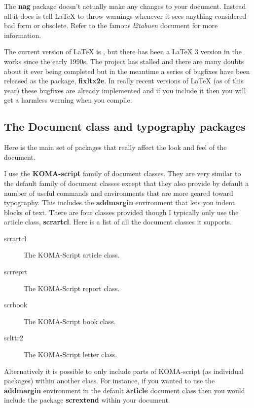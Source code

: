       The \textbf{nag} package doesn't actually make any changes to your document. Instead all it does is tell \LaTeX{} to throw warnings whenever it sees anything considered bad form or obsolete. Refer to the famous \textit{l2tabuen} document for more information.

      The current version of \LaTeX{} is \LaTeXe, but there has been a \LaTeX{} 3 version in the works since the early 1990s. The project has stalled and there are many doubts about it ever being completed but in the meantime a series of bugfixes have been released as the package, \textbf{fixltx2e}. In really recent versions of \LaTeX{} (as of this year) these bugfixes are already implemented and if you include it then you will get a harmless warning when you compile.

    \subsection{The Document class and typography packages}
      Here is the main set of packages that really affect the look and feel of the document.

      I use the \textbf{KOMA-script} family of document classes. They are very similar to the default family of document classes except that they also provide by default a number of useful commands and environments that are more geared toward typography. This includes the \textbf{addmargin} environment that lets you indent blocks of text. There are four classes provided though I typically only use the article class, \textbf{scrartcl}. Here is a list of all the document classes it supports.

      \begin{addmargin}{1cm}
        \begin{description}
          \item[scrartcl] The KOMA-Script article class.
          \item[scrreprt] The KOMA-Script report class.
          \item[scrbook] The KOMA-Script book class.
          \item[sclttr2] The KOMA-Script letter class.
        \end{description} 
      \end{addmargin}

      Alternatively it is possible to only include parts of KOMA-script (as individual packages) within another class. For instance, if you wanted to use the \textbf{addmargin} environment in the default \textbf{article} document class then you would include the package \textbf{scrextend} within your document.

